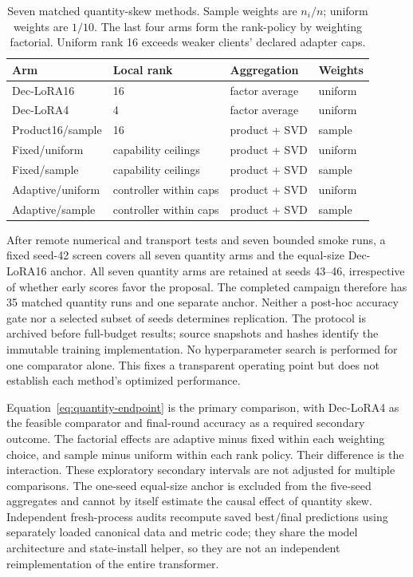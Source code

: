 \documentclass[11pt]{article}
\begin{document}
\begin{table}[t]
\centering
\caption{Seven matched quantity-skew methods. Sample weights are $n_i/n$; uniform weights are $1/10$. The last four arms form the rank-policy by weighting factorial. Uniform rank 16 exceeds weaker clients' declared adapter caps.}
\label{tab:quantity-design}
\small
\begin{tabular}{llll}
\toprule
Arm & Local rank & Aggregation & Weights\\
\midrule
Dec-LoRA16 & 16 & factor average & uniform\\
Dec-LoRA4 & 4 & factor average & uniform\\
Product16/sample & 16 & product + SVD & sample\\
Fixed/uniform & capability ceilings & product + SVD & uniform\\
Fixed/sample & capability ceilings & product + SVD & sample\\
Adaptive/uniform & controller within caps & product + SVD & uniform\\
Adaptive/sample & controller within caps & product + SVD & sample\\
\bottomrule
\end{tabular}
\end{table}

After remote numerical and transport tests and seven bounded smoke runs, a fixed seed-42 screen covers all seven quantity arms and the equal-size Dec-LoRA16 anchor. All seven quantity arms are retained at seeds 43--46, irrespective of whether early scores favor the proposal. The completed campaign therefore has 35 matched quantity runs and one separate anchor. Neither a post-hoc accuracy gate nor a selected subset of seeds determines replication. The protocol is archived before full-budget results; source snapshots and hashes identify the immutable training implementation. No hyperparameter search is performed for one comparator alone. This fixes a transparent operating point but does not establish each method's optimized performance.

Equation~\eqref{eq:quantity-endpoint} is the primary comparison, with Dec-LoRA4 as the feasible comparator and final-round accuracy as a required secondary outcome. The factorial effects are adaptive minus fixed within each weighting choice, and sample minus uniform within each rank policy. Their difference is the interaction. These exploratory secondary intervals are not adjusted for multiple comparisons. The one-seed equal-size anchor is excluded from the five-seed aggregates and cannot by itself estimate the causal effect of quantity skew. Independent fresh-process audits recompute saved best/final predictions using separately loaded canonical data and metric code; they share the model architecture and state-install helper, so they are not an independent reimplementation of the entire transformer.
\end{document}
